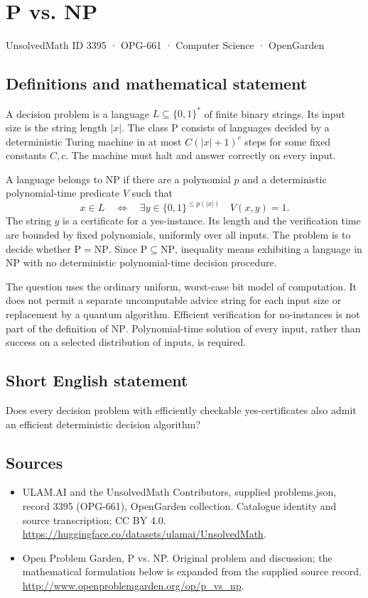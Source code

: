 \documentclass[11pt,a4paper]{article}
\begin{document}
\section*{P vs. NP}\label{3395}
{\small UnsolvedMath ID 3395 · OPG-661 · Computer Science · OpenGarden}
\subsection{Definitions and mathematical statement}
A decision problem is a language $L\subseteq\{0,1\}^*$ of finite
binary strings. Its input size is the string length $|x|$. The class
$\mathrm P$ consists of languages decided by a deterministic Turing
machine in at most $C(|x|+1)^c$ steps for some fixed constants $C,c$.
The machine must halt and answer correctly on every input.

A language belongs to $\mathrm{NP}$ if there are a polynomial $p$
and a deterministic polynomial-time predicate $V$ such that
\[
 x\in L\quad\Longleftrightarrow\quad
 \exists y\in\{0,1\}^{\le p(|x|)}\quad V(x,y)=1.
\]
The string $y$ is a certificate for a yes-instance. Its length and
the verification time are bounded by fixed polynomials, uniformly
over all inputs. The problem is to decide whether
$\mathrm P=\mathrm{NP}$. Since $\mathrm P\subseteq\mathrm{NP}$,
inequality means exhibiting a language in $\mathrm{NP}$ with no
deterministic polynomial-time decision procedure.

The question uses the ordinary uniform, worst-case bit model of
computation. It does not permit a separate uncomputable advice string
for each input size or replacement by a quantum algorithm. Efficient
verification for no-instances is not part of the definition of
$\mathrm{NP}$. Polynomial-time solution of every input, rather than
success on a selected distribution of inputs, is required.
\subsection{Short English statement}
Does every decision problem with efficiently checkable yes-certificates also admit an efficient deterministic decision algorithm?
\subsection{Sources}
\begin{itemize}
\item[S1] ULAM.AI and the UnsolvedMath Contributors, supplied problems.json, record 3395 (OPG-661), OpenGarden collection. Catalogue identity and source transcription; CC BY 4.0.
\url{https://huggingface.co/datasets/ulamai/UnsolvedMath}.
\item[S2] Open Problem Garden, P vs. NP. Original problem and discussion; the mathematical formulation below is expanded from the supplied source record.
\url{http://www.openproblemgarden.org/op/p_vs_np}.
\end{itemize}
\end{document}
